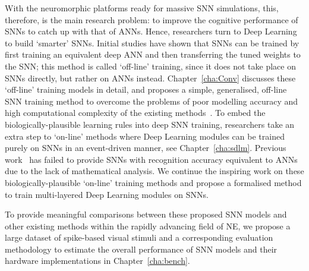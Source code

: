 

With the neuromorphic platforms ready for massive SNN simulations, this, therefore, is the main research problem: to improve the cognitive performance of SNNs to catch up with that of ANNs.
Hence, researchers turn to Deep Learning to build `smarter' SNNs.
Initial studies have shown that SNNs can be trained by first training an equivalent deep ANN and then transferring the tuned weights to the SNN;
this method is called `off-line' training, since it does not take place on SNNs directly, but rather on ANNs instead.
Chapter~\ref{cha:Conv} discusses these `off-line' training models in detail, and proposes a simple, generalised, off-line SNN training method to overcome the problems of poor modelling accuracy and high computational complexity of the existing methods~\citep{Jug_etal_2012,hunsberger2015spiking,diehl2015fast}.
To embed the biologically-plausible learning rules into deep SNN training, researchers take an extra step to `on-line' methods where Deep Learning modules can be trained purely on SNNs in an event-driven manner, see Chapter~\ref{cha:sdlm}.
Previous work~\citep{neil2013online,neftci2013event,burbank2015mirrored} has failed to provide SNNs with recognition accuracy equivalent to ANNs due to the lack of mathematical analysis.
We continue the inspiring work on these biologically-plausible `on-line' training methods and propose a formalised method to train multi-layered Deep Learning modules on SNNs.

To provide meaningful comparisons between these proposed SNN models and other existing methods within the rapidly advancing field of NE, we propose a large dataset of spike-based visual stimuli and a corresponding evaluation methodology to estimate the overall performance of SNN models and their hardware implementations in Chapter~\ref{cha:bench}.

